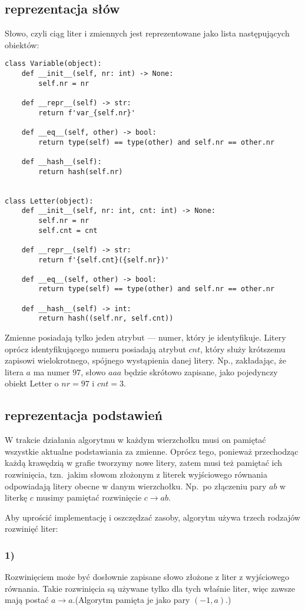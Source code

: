 \documentclass[leqno, 12pt]{article}
\begin{document}
\subsection{reprezentacja słów}
Słowo, czyli ciąg liter i zmiennych jest reprezentowane jako lista następujących obiektów:
\begin{verbatim}
class Variable(object):
    def __init__(self, nr: int) -> None:
        self.nr = nr

    def __repr__(self) -> str:
        return f'var_{self.nr}'

    def __eq__(self, other) -> bool:
        return type(self) == type(other) and self.nr == other.nr
    
    def __hash__(self):
        return hash(self.nr)


class Letter(object):
    def __init__(self, nr: int, cnt: int) -> None:
        self.nr = nr
        self.cnt = cnt

    def __repr__(self) -> str:
        return f'{self.cnt}({self.nr})'

    def __eq__(self, other) -> bool:
        return type(self) == type(other) and self.nr == other.nr

    def __hash__(self) -> int:
        return hash((self.nr, self.cnt))
\end{verbatim}
Zmienne posiadają tylko jeden atrybut --- numer, który je identyfikuje. Litery oprócz identyfikującego numeru posiadają atrybut $cnt$, który służy krótszemu zapisowi wielokrotnego, spójnego wystąpienia danej litery. Np., zakładając, że litera $a$ ma numer $97$, słowo $aaa$ będzie skrótowo zapisane, jako pojedynczy obiekt Letter o $nr = 97$ i $cnt = 3$.


\subsection{reprezentacja podstawień}
W trakcie działania algorytmu w każdym wierzchołku musi on pamiętać wszystkie aktualne podstawiania za zmienne. Oprócz tego, ponieważ przechodząc każdą krawędzią w grafie tworzymy nowe litery, zatem musi też pamiętać ich rozwinięcia, tzn.\ jakim słowom złożonym z literek wyjściowego równania odpowiadają litery obecne w danym wierzchołku. Np.\ po złączeniu pary $ab$ w literkę $c$ musimy pamiętać rozwinięcie $c \rightarrow ab$.


Aby uprościć implementację i oszczędzać zasoby, algorytm używa trzech rodzajów rozwinięć liter:

\subsubsection*{1)} Rozwinięciem może być dosłownie zapisane słowo złożone z liter z wyjściowego równania. Takie rozwinięcia są używane tylko dla tych właśnie liter, więc zawsze mają postać $a \rightarrow a$.\newline (Algorytm pamięta je jako pary $(-1, a)$.)
\end{document}
